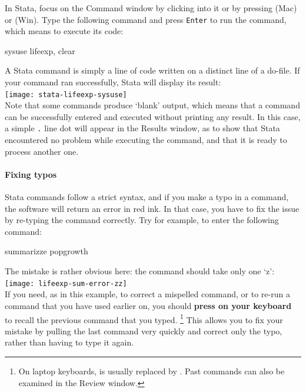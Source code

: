 	In Stata, focus on the Command window by clicking into it or by pressing  (Mac) or (Win). Type the following command and press \texttt{Enter} to run the command, which means to execute its code:%
		
	\begin{docspec}%
		\label{lifeexp}%
		sysuse lifeexp, clear
	\end{docspec}
		
	A Stata command is simply a line of code written on a distinct line of a do-file. If your command ran successfully, Stata will display its result:\\[1em]
		
		\texttt{[image: stata-lifeexp-sysuse]}\\[1em]

	Note that some commands produce `blank' output, which means that a command can be successfully entered and executed without printing any result. In this case, a simple \texttt{.} line dot will appear in the Results window, as to show that Stata encountered no problem while executing the command, and that it is ready to process another one.%

	\paragraph{Fixing typos}%

	Stata commands follow a strict syntax, and if you make a typo in a command, the software will return an error in red ink. In that case, you have to fix the issue by re-typing the command correctly. Try for example, to enter the following command:%
		
		\begin{docspec}
			summarizze popgrowth
		\end{docspec}%
		
		The mistake is rather obvious here: the  command should take only one `z':\\[1em]%
		
		\texttt{[image: lifeexp-sum-error-zz]}\\[1em]
		
		If you need, as in this example, to correct a mispelled command, or to re-run a command that you have used earlier on, you should \textbf{press  on your keyboard} to recall the previous command that you typed.%
		\footnote{On laptop keyboards,  is usually replaced by . Past commands can also be examined in the Review window.} %
		This allows you to fix your mistake by pulling the last command very quickly and correct only the typo, rather than having to type it again.%

